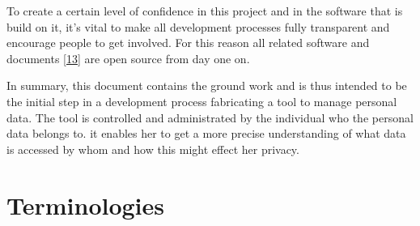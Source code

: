 \documentclass[12pt,english,a4paper,titlepage,cleardoublepage=empty,dottedtoc]{report}
\begin{document}
To create a certain level of confidence in this project and in the
software that is build on it, it's vital to make all development
processes fully transparent and encourage people to get involved. For
this reason all related software and documents
{[}\protect\hyperlink{ref-repo_2016_pdaas-spec}{13}{]} are open source
from day one on.

In summary, this document contains the ground work and is thus intended
to be the initial step in a development process fabricating a tool to
manage personal data. The tool is controlled and administrated by the
individual who the personal data belongs to. it enables her to get a
more precise understanding of what data is accessed by whom and how this
might effect her privacy.

\hypertarget{terminologies}{\section{Terminologies}\label{terminologies}}
\end{document}
